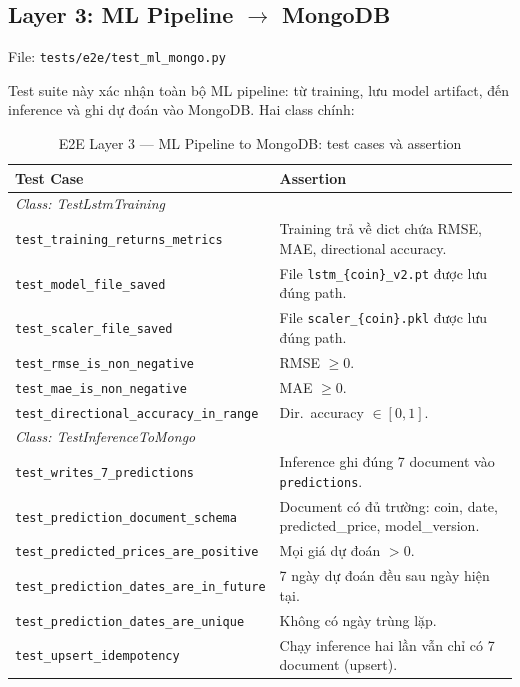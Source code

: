 \documentclass[12pt, a4paper]{article}
\begin{document}
\subsection{Layer 3: ML Pipeline $\to$ MongoDB}

File: \texttt{tests/e2e/test\_ml\_mongo.py}

Test suite này xác nhận toàn bộ ML pipeline: từ training, lưu model artifact, đến
inference và ghi dự đoán vào MongoDB. Hai class chính:

\begin{table}[H]
  \centering
  \footnotesize
  \caption{E2E Layer 3 --- ML Pipeline to MongoDB: test cases và assertion}
  \label{tab:e2e_layer3}
  \begin{tabular}{p{7.2cm}p{6.8cm}}
    \toprule
    \textbf{Test Case} & \textbf{Assertion} \\
    \midrule
    \multicolumn{2}{l}{\textit{Class: TestLstmTraining}} \\
    \midrule
    \texttt{test\_training\_returns\_metrics}      & Training trả về dict chứa RMSE, MAE, directional accuracy. \\[3pt]
    \texttt{test\_model\_file\_saved}              & File \texttt{lstm\_\{coin\}\_v2.pt} được lưu đúng path. \\[3pt]
    \texttt{test\_scaler\_file\_saved}             & File \texttt{scaler\_\{coin\}.pkl} được lưu đúng path. \\[3pt]
    \texttt{test\_rmse\_is\_non\_negative}         & RMSE $\geq 0$. \\[3pt]
    \texttt{test\_mae\_is\_non\_negative}          & MAE $\geq 0$. \\[3pt]
    \texttt{test\_directional\_accuracy\_in\_range}& Dir.\ accuracy $\in [0, 1]$. \\
    \midrule
    \multicolumn{2}{l}{\textit{Class: TestInferenceToMongo}} \\
    \midrule
    \texttt{test\_writes\_7\_predictions}              & Inference ghi đúng 7 document vào \texttt{predictions}. \\[3pt]
    \texttt{test\_prediction\_document\_schema}        & Document có đủ trường: coin, date, predicted\_price, model\_version. \\[3pt]
    \texttt{test\_predicted\_prices\_are\_positive}    & Mọi giá dự đoán $> 0$. \\[3pt]
    \texttt{test\_prediction\_dates\_are\_in\_future}  & 7 ngày dự đoán đều sau ngày hiện tại. \\[3pt]
    \texttt{test\_prediction\_dates\_are\_unique}      & Không có ngày trùng lặp. \\[3pt]
    \texttt{test\_upsert\_idempotency}                 & Chạy inference hai lần vẫn chỉ có 7 document (upsert). \\
    \bottomrule
  \end{tabular}
\end{table}
\end{document}
